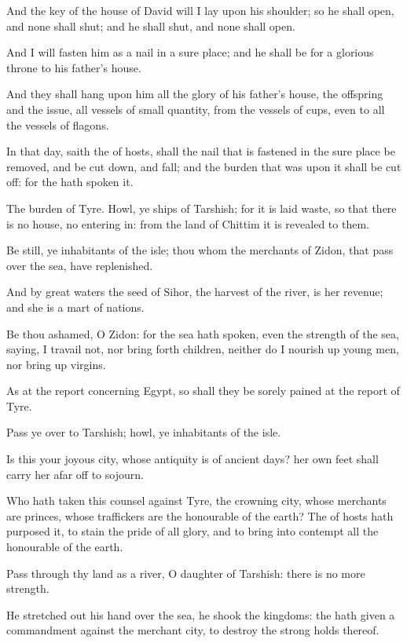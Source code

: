 \Verse And the key of the house of David will I lay upon his shoulder; so he shall open, and none shall shut; and he shall shut, and none shall open.

\Verse And I will fasten him as a nail in a sure place; and he shall be for a glorious throne to his father's house.

\Verse And they shall hang upon him all the glory of his father's house, the offspring and the issue, all vessels of small quantity, from the vessels of cups, even to all the vessels of flagons.

\Verse In that day, saith the \LORD of hosts, shall the nail that is fastened in the sure place be removed, and be cut down, and fall; and the burden that was upon it shall be cut off: for the \LORD hath spoken it.


\Chapter
\Verse The burden of Tyre. Howl, ye ships of Tarshish; for it is laid waste, so that there is no house, no entering in: from the land of Chittim it is revealed to them.

\Verse Be still, ye inhabitants of the isle; thou whom the merchants of Zidon, that pass over the sea, have replenished.

\Verse And by great waters the seed of Sihor, the harvest of the river, is her revenue; and she is a mart of nations.

\Verse Be thou ashamed, O Zidon: for the sea hath spoken, even the strength of the sea, saying, I travail not, nor bring forth children, neither do I nourish up young men, nor bring up virgins.

\Verse As at the report concerning Egypt, so shall they be sorely pained at the report of Tyre.

\Verse Pass ye over to Tarshish; howl, ye inhabitants of the isle.

\Verse Is this your joyous city, whose antiquity is of ancient days? her own feet shall carry her afar off to sojourn.

\Verse Who hath taken this counsel against Tyre, the crowning city, whose merchants are princes, whose traffickers are the honourable of the earth?  \Verse The \LORD of hosts hath purposed it, to stain the pride of all glory, and to bring into contempt all the honourable of the earth.

\Verse Pass through thy land as a river, O daughter of Tarshish: there is no more strength.

\Verse He stretched out his hand over the sea, he shook the kingdoms: the \LORD hath given a commandment against the merchant city, to destroy the strong holds thereof.

